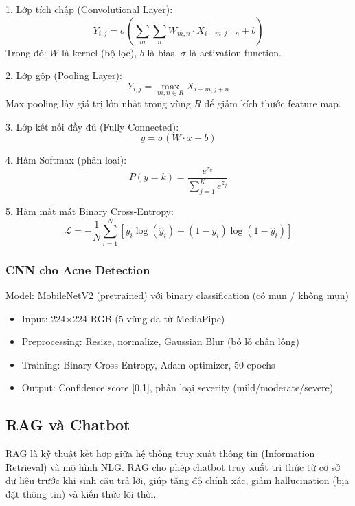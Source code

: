 1. Lớp tích chập (Convolutional Layer):
\begin{equation}
Y_{i,j} = \sigma\left(\sum_{m}\sum_{n} W_{m,n} \cdot X_{i+m,j+n} + b\right)
\end{equation}
Trong đó: $W$ là kernel (bộ lọc), $b$ là bias, $\sigma$ là activation function.

2. Lớp gộp (Pooling Layer):
\begin{equation}
Y_{i,j} = \max_{m,n \in R} X_{i+m,j+n}
\end{equation}
Max pooling lấy giá trị lớn nhất trong vùng $R$ để giảm kích thước feature map.

3. Lớp kết nối đầy đủ (Fully Connected):
\begin{equation}
y = \sigma(W \cdot x + b)
\end{equation}

4. Hàm Softmax (phân loại):
\begin{equation}
P(y=k) = \frac{e^{z_k}}{\sum_{j=1}^{K} e^{z_j}}
\end{equation}

5. Hàm mất mát Binary Cross-Entropy:
\begin{equation}
\mathcal{L} = -\frac{1}{N} \sum_{i=1}^{N} \left[y_i \log(\hat{y}_i) + (1-y_i) \log(1-\hat{y}_i)\right]
\end{equation}

\subsubsection{CNN cho Acne Detection}

Model: MobileNetV2 (pretrained) với binary classification (có mụn / không mụn)
\begin{itemize}
    \item Input: 224×224 RGB (5 vùng da từ MediaPipe)
    \item Preprocessing: Resize, normalize, Gaussian Blur (bỏ lỗ chân lông)
    \item Training: Binary Cross-Entropy, Adam optimizer, 50 epochs
    \item Output: Confidence score [0,1], phân loại severity (mild/moderate/severe)
\end{itemize}

\subsection{RAG và Chatbot}

RAG là kỹ thuật kết hợp giữa hệ thống truy xuất thông tin (Information Retrieval) và mô hình NLG. 
RAG cho phép chatbot truy xuất tri thức từ cơ sở dữ liệu trước khi sinh câu trả lời, giúp tăng độ chính xác, giảm hallucination (bịa đặt thông tin) và kiến thức lõi thời.

